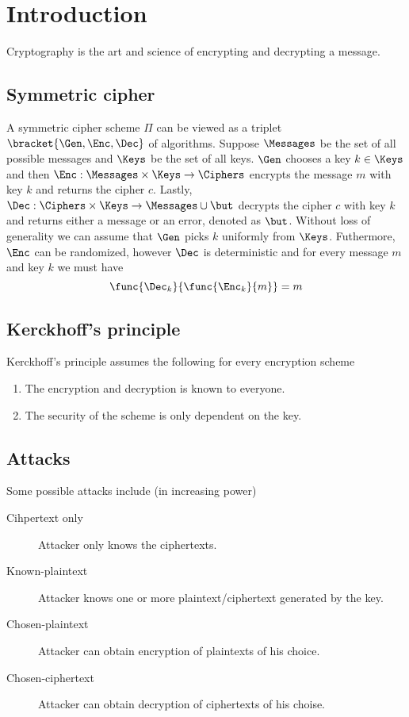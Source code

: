 \chapter{Introduction}
Cryptography is the art and science of encrypting and decrypting a message. 
\section{Symmetric cipher}
A symmetric cipher scheme \(\Pi\) can be viewed as a triplet \(\bracket{\Gen, \Enc , \Dec}\) of algorithms. Suppose \(\Messages\) be the set of all possible messages and \(\Keys\) be the set of all keys. \(\Gen\) chooses a key \(k \in \Keys\) and then \(\Enc : \Messages \times \Keys \to \Ciphers\) encrypts the message \(m\) with key \(k\) and returns the cipher \(c\). Lastly, \(\Dec: \Ciphers \times \Keys \to \Messages \cup \but\) decrypts the cipher \(c\) with key \(k\) and returns either a message or an error, denoted as \(\but\). Without loss of generality we can assume that \(\Gen\) picks \(k\) uniformly from \(\Keys\). Futhermore, \(\Enc\) can be randomized, however \(\Dec\) is deterministic and for every message \(m\) and key \(k\) we must have 
\begin{equation*}
    \func{\Dec_k}{\func{\Enc_k}{m}} = m
\end{equation*}

\section{Kerckhoff's principle}
Kerckhoff's principle assumes the following for every encryption scheme 
\begin{enumerate}
    \item The encryption and decryption is known to everyone.
    \item The security of the scheme is only dependent on the key.
\end{enumerate}


\section{Attacks}
Some possible attacks include (in increasing power)
\begin{description}
    \item [Cihpertext only] Attacker only knows the ciphertexts.
    \item [Known-plaintext] Attacker knows one or more plaintext/ciphertext generated by the key.
    \item [Chosen-plaintext] Attacker can obtain encryption of plaintexts of his choice.
    \item [Chosen-ciphertext] Attacker can obtain decryption of ciphertexts of his choise.
\end{description}